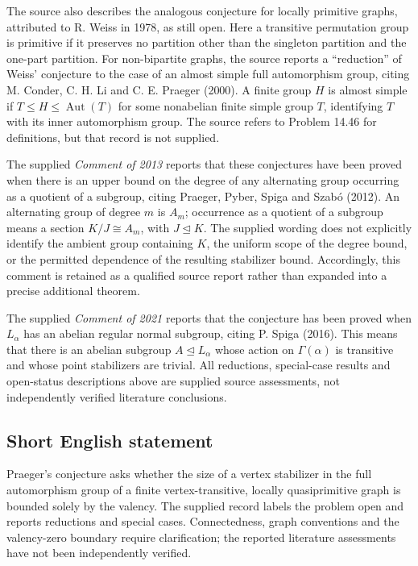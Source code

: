 \documentclass[11pt]{article}
\begin{document}
The source also describes the analogous conjecture for locally primitive graphs, attributed to R. Weiss in 1978, as still open. Here a transitive permutation group is primitive if it preserves no partition other than the singleton partition and the one-part partition. For non-bipartite graphs, the source reports a ``reduction'' of Weiss' conjecture to the case of an almost simple full automorphism group, citing M. Conder, C. H. Li and C. E. Praeger (2000). A finite group \(H\) is almost simple if \(T\leq H\leq\operatorname{Aut}(T)\) for some nonabelian finite simple group \(T\), identifying \(T\) with its inner automorphism group. The source refers to Problem 14.46 for definitions, but that record is not supplied.

The supplied \emph{Comment of 2013} reports that these conjectures have been proved when there is an upper bound on the degree of any alternating group occurring as a quotient of a subgroup, citing Praeger, Pyber, Spiga and Szab\'{o} (2012). An alternating group of degree \(m\) is \(A_m\); occurrence as a quotient of a subgroup means a section \(K/J\cong A_m\), with \(J\trianglelefteq K\). The supplied wording does not explicitly identify the ambient group containing \(K\), the uniform scope of the degree bound, or the permitted dependence of the resulting stabilizer bound. Accordingly, this comment is retained as a qualified source report rather than expanded into a precise additional theorem.

The supplied \emph{Comment of 2021} reports that the conjecture has been proved when \(L_\alpha\) has an abelian regular normal subgroup, citing P. Spiga (2016). This means that there is an abelian subgroup \(A\trianglelefteq L_\alpha\) whose action on \(\Gamma(\alpha)\) is transitive and whose point stabilizers are trivial. All reductions, special-case results and open-status descriptions above are supplied source assessments, not independently verified literature conclusions.
\subsection{Short English statement}
Praeger's conjecture asks whether the size of a vertex stabilizer in the full automorphism group of a finite vertex-transitive, locally quasiprimitive graph is bounded solely by the valency. The supplied record labels the problem open and reports reductions and special cases. Connectedness, graph conventions and the valency-zero boundary require clarification; the reported literature assessments have not been independently verified.
\end{document}
